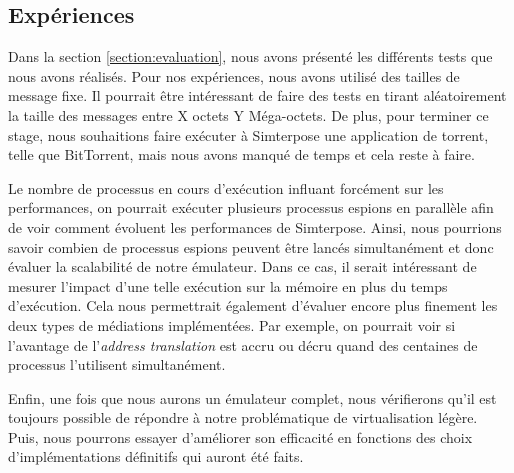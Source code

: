 \subsection{Expériences}
Dans la section \ref{section:evaluation}, nous avons présenté les différents tests que nous avons réalisés. Pour nos expériences, nous avons utilisé des tailles de message fixe. Il pourrait être intéressant de faire des tests en tirant aléatoirement la taille des messages entre X octets Y Méga-octets. De plus, pour terminer ce stage, nous souhaitions faire exécuter à Simterpose une application de torrent, telle que BitTorrent, mais nous avons manqué de temps et cela reste à faire.

Le nombre de processus en cours d'exécution influant forcément sur les performances, on pourrait exécuter plusieurs processus espions en parallèle afin de voir comment évoluent les performances de Simterpose. Ainsi, nous pourrions savoir  combien de processus espions peuvent être lancés simultanément et donc évaluer la scalabilité de notre émulateur. Dans ce cas, il serait intéressant de mesurer l'impact d'une telle exécution sur la mémoire en plus du temps d'exécution. Cela nous permettrait également d'évaluer encore plus finement les deux types de médiations implémentées. Par exemple, on pourrait voir si l'avantage de l'\textit{address translation} est accru ou décru quand des centaines de processus l'utilisent simultanément.

Enfin, une fois que nous aurons un émulateur complet, nous vérifierons qu'il est toujours possible de répondre à notre problématique de virtualisation légère. Puis, nous pourrons essayer d'améliorer son efficacité en fonctions des choix d'implémentations définitifs qui auront été faits.



